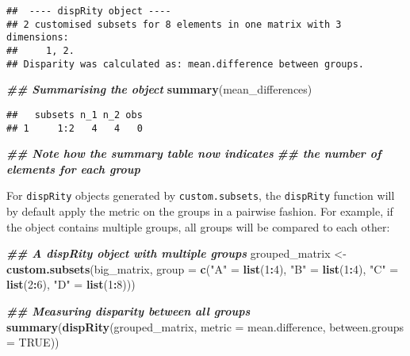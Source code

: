 \documentclass[
]{book}
\newenvironment{Shaded}{\begin{snugshade}}{\end{snugshade}}
\newcommand{\AttributeTok}[1]{\textcolor[rgb]{0.13,0.29,0.53}{#1}}
\newcommand{\ConstantTok}[1]{\textcolor[rgb]{0.56,0.35,0.01}{#1}}
\newcommand{\DecValTok}[1]{\textcolor[rgb]{0.00,0.00,0.81}{#1}}
\newcommand{\DocumentationTok}[1]{\textcolor[rgb]{0.56,0.35,0.01}{\textbf{\textit{#1}}}}
\newcommand{\FunctionTok}[1]{\textcolor[rgb]{0.13,0.29,0.53}{\textbf{#1}}}
\newcommand{\NormalTok}[1]{#1}
\newcommand{\OtherTok}[1]{\textcolor[rgb]{0.56,0.35,0.01}{#1}}
\newcommand{\SpecialCharTok}[1]{\textcolor[rgb]{0.81,0.36,0.00}{\textbf{#1}}}
\newcommand{\StringTok}[1]{\textcolor[rgb]{0.31,0.60,0.02}{#1}}
\begin{document}
\begin{verbatim}
##  ---- dispRity object ---- 
## 2 customised subsets for 8 elements in one matrix with 3 dimensions:
##     1, 2.
## Disparity was calculated as: mean.difference between groups.
\end{verbatim}

\begin{Shaded}
\begin{Highlighting}[]
\DocumentationTok{\#\# Summarising the object}
\FunctionTok{summary}\NormalTok{(mean\_differences)}
\end{Highlighting}
\end{Shaded}

\begin{verbatim}
##   subsets n_1 n_2 obs
## 1     1:2   4   4   0
\end{verbatim}

\begin{Shaded}
\begin{Highlighting}[]
\DocumentationTok{\#\# Note how the summary table now indicates}
\DocumentationTok{\#\# the number of elements for each group}
\end{Highlighting}
\end{Shaded}

For \texttt{dispRity} objects generated by \texttt{custom.subsets}, the \texttt{dispRity} function will by default apply the metric on the groups in a pairwise fashion.
For example, if the object contains multiple groups, all groups will be compared to each other:

\begin{Shaded}
\begin{Highlighting}[]
\DocumentationTok{\#\# A dispRity object with multiple groups}
\NormalTok{grouped\_matrix }\OtherTok{\textless{}{-}} \FunctionTok{custom.subsets}\NormalTok{(big\_matrix,}
                                 \AttributeTok{group =} \FunctionTok{c}\NormalTok{(}\StringTok{"A"} \OtherTok{=} \FunctionTok{list}\NormalTok{(}\DecValTok{1}\SpecialCharTok{:}\DecValTok{4}\NormalTok{),}
                                           \StringTok{"B"} \OtherTok{=} \FunctionTok{list}\NormalTok{(}\DecValTok{1}\SpecialCharTok{:}\DecValTok{4}\NormalTok{),}
                                           \StringTok{"C"} \OtherTok{=} \FunctionTok{list}\NormalTok{(}\DecValTok{2}\SpecialCharTok{:}\DecValTok{6}\NormalTok{), }
                                           \StringTok{"D"} \OtherTok{=} \FunctionTok{list}\NormalTok{(}\DecValTok{1}\SpecialCharTok{:}\DecValTok{8}\NormalTok{)))}

\DocumentationTok{\#\# Measuring disparity between all groups}
\FunctionTok{summary}\NormalTok{(}\FunctionTok{dispRity}\NormalTok{(grouped\_matrix, }\AttributeTok{metric =}\NormalTok{ mean.difference,}
                 \AttributeTok{between.groups =} \ConstantTok{TRUE}\NormalTok{))}
\end{Highlighting}
\end{Shaded}
\end{document}
